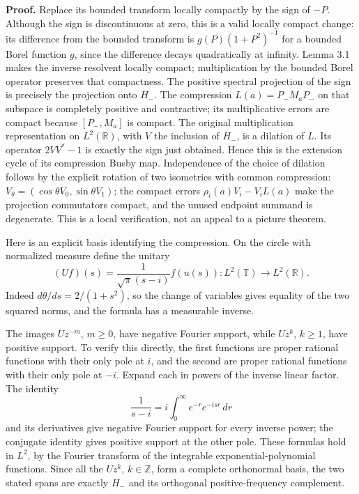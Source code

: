 \documentclass[
  11pt,
]{article}
\begin{document}
\textbf{Proof.} Replace its bounded transform locally compactly by the
sign of \(-P\). Although the sign is discontinuous at zero, this is a
valid locally compact change: its difference from the bounded transform
is \(g(P)(1+P^2)^{-1}\) for a bounded Borel function \(g\), since the
difference decays quadratically at infinity. Lemma 3.1 makes the inverse
resolvent locally compact; multiplication by the bounded Borel operator
preserves that compactness. The positive spectral projection of the sign
is precisely the projection onto \(H_-\). The compression
\(L(a)=P_-M_aP_-\) on that subspace is completely positive and
contractive; its multiplicative errors are compact because \([P_-,M_a]\)
is compact. The original multiplication representation on
\(L^2(\mathbb R)\), with \(V\) the inclusion of \(H_-\), is a dilation
of \(L\). Its operator \(2VV^*-1\) is exactly the sign just obtained.
Hence this is the extension cycle of its compression Busby map.
Independence of the choice of dilation follows by the explicit rotation
of two isometries with common compression:
\(V_\theta=(\cos\theta V_0,\sin\theta V_1)\); the compact errors
\(\rho_i(a)V_i-V_iL(a)\) make the projection commutators compact, and
the unused endpoint summand is degenerate. This is a local verification,
not an appeal to a picture theorem.

Here is an explicit basis identifying the compression. On the circle
with normalized measure define the unitary \[
(Uf)(s)=\frac{1}{\sqrt\pi(s-i)}f(u(s)):
L^2(\mathbb T)\longrightarrow L^2(\mathbb R).
\tag{7.6}
\] Indeed \(d\theta/ds=2/(1+s^2)\), so the change of variables gives
equality of the two squared norms, and the formula has a measurable
inverse.

The images \(Uz^{-m}\), \(m\geq0\), have negative Fourier support, while
\(Uz^k\), \(k\geq1\), have positive support. To verify this directly,
the first functions are proper rational functions with their only pole
at \(i\), and the second are proper rational functions with their only
pole at \(-i\). Expand each in powers of the inverse linear factor. The
identity \[
\frac1{s-i}=i\int_0^\infty e^{-r}e^{-isr}\,dr
\] and its derivatives give negative Fourier support for every inverse
power; the conjugate identity gives positive support at the other pole.
These formulas hold in \(L^2\), by the Fourier transform of the
integrable exponential-polynomial functions. Since all the \(Uz^k\),
\(k\in\mathbb Z\), form a complete orthonormal basis, the two stated
spans are exactly \(H_-\) and its orthogonal positive-frequency
complement.
\end{document}
